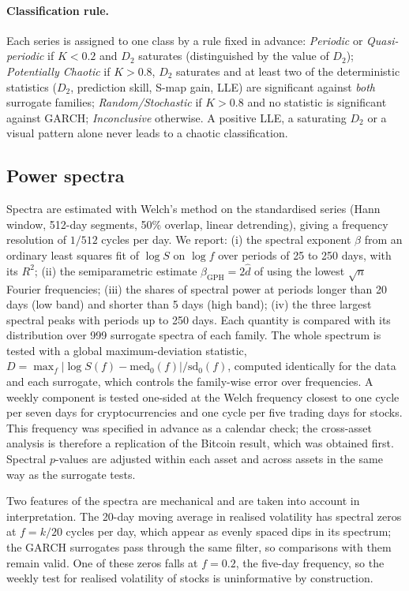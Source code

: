 \documentclass[11pt,a4paper]{article}
\begin{document}
\paragraph{Classification rule.} Each series is assigned to one class by a rule fixed in advance:
\emph{Periodic} or \emph{Quasi-periodic} if $K<0.2$ and $D_2$ saturates (distinguished by the value of $D_2$);
\emph{Potentially Chaotic} if $K>0.8$, $D_2$ saturates and at least two of the deterministic statistics ($D_2$,
prediction skill, S-map gain, LLE) are significant against \emph{both} surrogate families; \emph{Random/Stochastic} if
$K>0.8$ and no statistic is significant against GARCH; \emph{Inconclusive} otherwise. A positive LLE, a saturating
$D_2$ or a visual pattern alone never leads to a chaotic classification.

\subsection{Power spectra}
Spectra are estimated with Welch's method \citep{Welch1967} on the standardised series (Hann window, 512-day segments,
50\% overlap, linear detrending), giving a frequency resolution of $1/512$ cycles per day. We report:
(i) the spectral exponent $\beta$ from an ordinary least squares fit of $\log S$ on $\log f$ over periods of 25 to
250 days, with its $R^2$; (ii) the semiparametric estimate $\beta_{\mathrm{GPH}}=2\hat d$ of
\citet{GewekePorterHudak1983} using the lowest $\sqrt n$ Fourier frequencies; (iii) the shares of spectral power at
periods longer than 20 days (low band) and shorter than 5 days (high band); (iv) the three largest spectral peaks
with periods up to 250 days. Each quantity is compared with its distribution over 999 surrogate spectra of each
family. The whole spectrum is tested with a global maximum-deviation statistic,
$D=\max_f |\log S(f)-\mathrm{med}_0(f)|/\mathrm{sd}_0(f)$, computed identically for the data and each surrogate, which
controls the family-wise error over frequencies. A weekly component is tested one-sided at the Welch frequency
closest to one cycle per seven days for cryptocurrencies and one cycle per five trading days for stocks. This
frequency was specified in advance as a calendar check; the cross-asset analysis is therefore a replication of the
Bitcoin result, which was obtained first. Spectral $p$-values are adjusted within each asset and across assets in
the same way as the surrogate tests.

Two features of the spectra are mechanical and are taken into account in interpretation. The 20-day moving average
in realised volatility has spectral zeros at $f=k/20$ cycles per day, which appear as evenly spaced dips in its
spectrum; the GARCH surrogates pass through the same filter, so comparisons with them remain valid. One of these
zeros falls at $f=0.2$, the five-day frequency, so the weekly test for realised volatility of stocks is uninformative
by construction.
\end{document}
